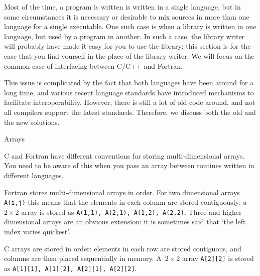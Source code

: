 Most of the time, a program is written is written in a single
language, but in some circumstances it is necessary or desirable to
mix sources in more than one language for a single executable. One
such case is when a library is written in one language, but used by a
program in another. In such a case, the library writer will probably
have made it easy for you to use the library; this section is for the
case that you find yourself in the place of the library writer. We
will focus on the common case of interfacing between C/C++ and
Fortran.

This issue is complicated by the fact that both languages have
been around for a long time, and various recent language standards
have introduced mechanisms to facilitate interoperability.
However, there is still a lot of old code around, and not all compilers
support the latest standards. Therefore, we discuss both the old 
and the new solutions.

 {Arrays}
\label{sec:CFarrays}

C and Fortran have different conventions for storing multi-dimensional
arrays. You need to be aware of this when you pass an array between
routines written in different languages. 

Fortran stores multi-dimensional arrays in 
order. For two dimensional arrays \texttt{A(i,j)} this means that
the elements in each column are stored contiguously: a $2\times2$
array is stored as \texttt{A(1,1), A(2,1), A(1,2), A(2,2)}. Three and
higher dimensional arrays are an obvious extension: it is sometimes
said that `the left index varies quickest'.

C arrays are stored in  order: elements in each
row are stored contiguous, and columns are then placed sequentially in
memory. A~$2\times2$ array \texttt{A[2][2]} is stored as
\texttt{A[1][1], A[1][2], A[2][1], A[2][2]}. 

